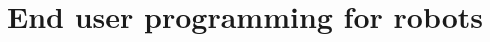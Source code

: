 \documentclass[10pt,twocolumn]{article}
\begin{document}

% 



\section{End user programming for robots}
\end{document}

